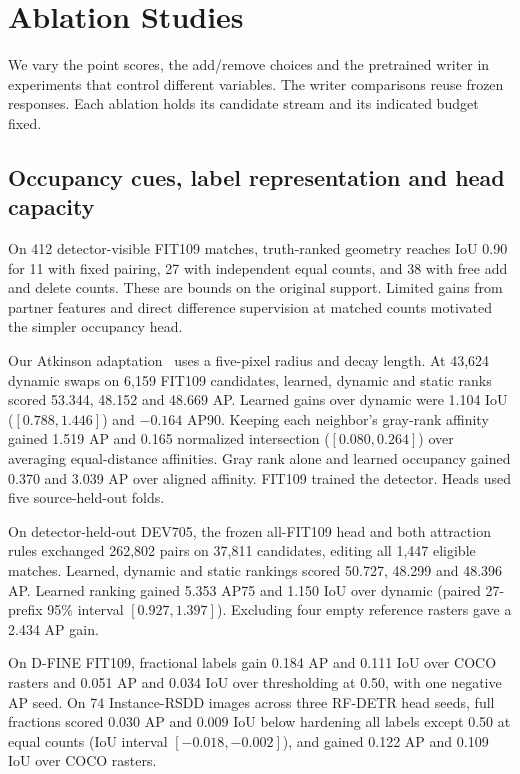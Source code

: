\documentclass[journal]{IEEEtran}
\begin{document}
\FloatBarrier
\section{Ablation Studies}
\label{sec:ablation}
We vary the point scores, the add/remove choices and the pretrained writer in experiments that control different variables. The writer comparisons reuse frozen responses. Each ablation holds its candidate stream and its indicated budget fixed.

\subsection{Occupancy cues, label representation and head capacity}
On 412 detector-visible FIT109 matches, truth-ranked geometry reaches IoU 0.90 for 11 with fixed pairing, 27 with independent equal counts, and 38 with free add and delete counts. These are bounds on the original support. Limited gains from partner features and direct difference supervision at matched counts motivated the simpler occupancy head.

Our Atkinson adaptation~\cite{atkinson} uses a five-pixel radius and decay length. At 43,624 dynamic swaps on 6,159 FIT109 candidates, learned, dynamic and static ranks scored 53.344, 48.152 and 48.669 AP. Learned gains over dynamic were 1.104 IoU (\([0.788,1.446]\)) and \(-0.164\) AP90. Keeping each neighbor's gray-rank affinity gained 1.519 AP and 0.165 normalized intersection (\([0.080,0.264]\)) over averaging equal-distance affinities. Gray rank alone and learned occupancy gained 0.370 and 3.039 AP over aligned affinity. FIT109 trained the detector. Heads used five source-held-out folds.

On detector-held-out DEV705, the frozen all-FIT109 head and both attraction rules exchanged 262,802 pairs on 37,811 candidates, editing all 1,447 eligible matches. Learned, dynamic and static rankings scored 50.727, 48.299 and 48.396 AP. Learned ranking gained 5.353 AP75 and 1.150 IoU over dynamic (paired 27-prefix 95\% interval \([0.927,1.397]\)). Excluding four empty reference rasters gave a 2.434 AP gain.

On D-FINE FIT109, fractional labels gain 0.184 AP and 0.111 IoU over COCO rasters and 0.051 AP and 0.034 IoU over thresholding at 0.50, with one negative AP seed. On 74 Instance-RSDD images across three RF-DETR head seeds, full fractions scored 0.030 AP and 0.009 IoU below hardening all labels except 0.50 at equal counts (IoU interval \([-0.018,-0.002]\)), and gained 0.122 AP and 0.109 IoU over COCO rasters.
\end{document}

